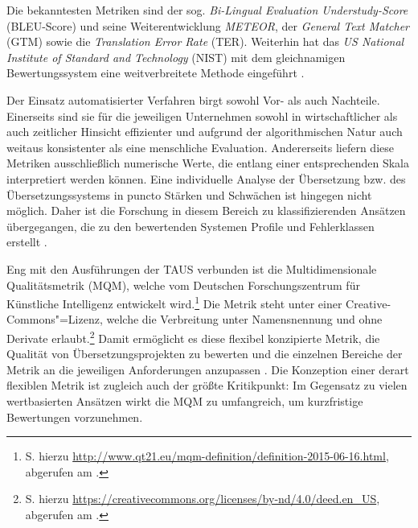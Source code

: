 \begin{sloppypar}
Die bekanntesten Metriken sind der sog. \emph{Bi-Lingual Evaluation Understudy-Score} ({BLEU-Score}) und seine Weiterentwicklung \emph{METEOR}, der \emph{General Text Matcher} ({GTM}) sowie die \emph{Translation Error Rate} ({TER}). Weiterhin hat das \emph{US National Institute of Standard and Technology} ({NIST}) mit dem gleichnamigen Bewertungssystem eine weitverbreitete Methode eingeführt \citep[]{translation_automation_user_society_taus_category:metrics_2017}.
\end{sloppypar}

Der Einsatz automatisierter Verfahren birgt sowohl Vor- als auch Nachteile. Einerseits sind sie für die jeweiligen Unternehmen sowohl in wirtschaftlicher als auch zeitlicher Hinsicht effizienter und aufgrund der algorithmischen Natur auch weitaus konsistenter als eine menschliche Evaluation. Andererseits liefern diese Metriken ausschließlich numerische Werte, die entlang einer entsprechenden Skala interpretiert werden können. Eine individuelle Analyse der Übersetzung bzw. des Übersetzungssystems in puncto Stärken und Schwächen ist hingegen nicht möglich. Daher ist die Forschung in diesem Bereich zu klassifizierenden Ansätzen übergegangen, die zu den bewertenden Systemen Profile und Fehlerklassen erstellt \citep[130\psq]{popovic_language-related_2018}.

Eng mit den Ausführungen der TAUS verbunden ist die Multidimensionale Qualitätsmetrik (MQM), welche vom Deutschen Forschungszentrum für Künstliche Intelligenz entwickelt wird.\footnote{S. hierzu \url{http://www.qt21.eu/mqm-definition/definition-2015-06-16.html}, abgerufen am \datum{}.} Die Metrik steht unter einer Creative-Com\-mons"=Lizenz, welche die Verbreitung unter Namensnennung und ohne Derivate erlaubt.\footnote{S. hierzu \url{https://creativecommons.org/licenses/by-nd/4.0/deed.en_US}, abgerufen am \datum{}.} Damit ermöglicht es diese flexibel konzipierte Metrik, die Qualität von Übersetzungsprojekten zu bewerten und die einzelnen Bereiche der Metrik an die jeweiligen Anforderungen anzupassen \citep[]{lommel_multidimensional_2014}. Die Konzeption einer derart flexiblen Metrik ist zugleich auch der größte Kritikpunkt: Im Gegensatz zu vielen wertbasierten Ansätzen wirkt die MQM zu umfangreich, um kurzfristige Bewertungen vorzunehmen.

